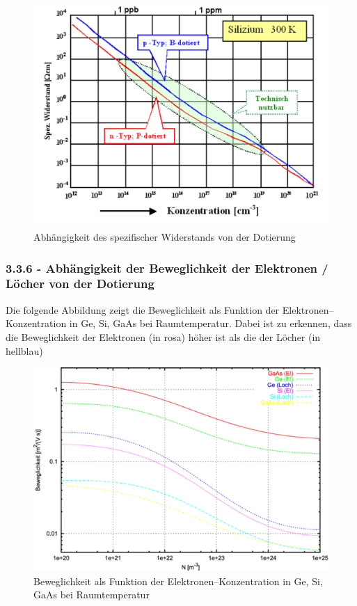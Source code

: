 \documentclass[a4paper]{scrartcl}
\numberwithin{equation}{subsection}
\begin{document}
\begin{figure}[H]
\includegraphics[width=12cm]{spezifischer_Widerstand_Silizium}
\centering
\caption{Abhängigkeit des spezifischer Widerstands von der Dotierung \protect\footnotemark}
\centering
\label{fig:spezifischer-widerstand-silizium}
\end{figure}


\subsubsection{3.3.6 - Abhängigkeit der Beweglichkeit der Elektronen / Löcher von der Dotierung}
Die folgende Abbildung zeigt die Beweglichkeit als Funktion der Elektronen–Konzentration in Ge, Si, GaAs bei Raumtemperatur. Dabei ist zu erkennen, dass die Beweglichkeit der Elektronen (in rosa) höher ist als die der Löcher (in hellblau)

\begin{figure}[H]
\includegraphics[width=12cm]{beweglichkeit-Silizium}
\centering
\caption{Beweglichkeit als Funktion der Elektronen–Konzentration in Ge, Si, GaAs bei Raumtemperatur \protect\footnotemark}
\centering
\label{fig:beweglichkeit-silizium}
\end{figure}
\end{document}

